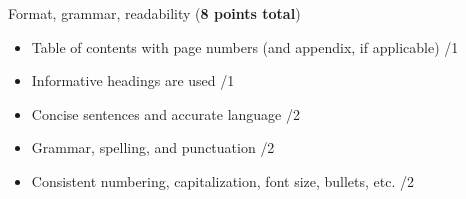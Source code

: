 \documentclass{article}
\begin{document}
Format, grammar, readability (\textbf{8 points total})
\begin{small}
\begin{itemize}
	\item Table of contents with page numbers (and appendix, if applicable) \hfill \underline{\hspace{1cm}}/1
	\item Informative headings are used \hfill \underline{\hspace{1cm}}/1
	\item Concise sentences and accurate language \hfill \underline{\hspace{1cm}}/2
	\item Grammar, spelling, and punctuation \hfill \underline{\hspace{1cm}}/2
	\item Consistent numbering, capitalization, font size, bullets, etc. \hfill \underline{\hspace{1cm}}/2
\end{itemize}
\end{small}\
\end{document}

